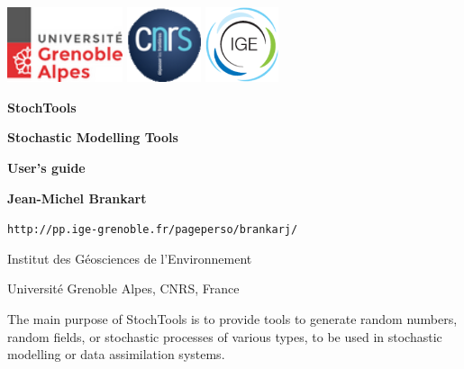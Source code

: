 \documentclass[11pt]{article}
\begin{document}
\pagestyle{empty}

\centerline{
\includegraphics[height=22mm]{Logos/logo_uga.png}
\hspace{5mm}
\includegraphics[height=22mm]{Logos/logo_cnrs.png}
\hfill
\includegraphics[height=22mm]{Logos/logo_ige.png}
}

\vspace{20mm}

\begin{center}

{\Huge\bf StochTools}

\vspace{10mm}

{\Large\bf Stochastic Modelling Tools}

\vspace{10mm}

{\Large\bf User's guide}

\vspace{10mm}

{\large\bf Jean-Michel Brankart}

\vspace{5mm}
{\tt http://pp.ige-grenoble.fr/pageperso/brankarj/}

\vspace{5mm}
{\large Institut des G\'eosciences de l'Environnement}

\vspace{1mm}
{\large Universit\'e Grenoble Alpes, CNRS, France}

\end{center}

\vspace{20mm}
The main purpose of StochTools is to provide tools
to generate random numbers, random fields,
or stochastic processes of various types,
to be used in stochastic modelling or data assimilation systems.
\end{document}
